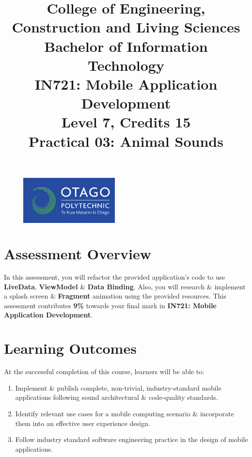 \documentclass{article}
\author{}
\begin{document}
\begin{figure}
    \centering
    \includegraphics[width=50mm]{./img/logo.png}
\end{figure}

\title{College of Engineering, Construction and Living Sciences\\Bachelor of Information Technology\\IN721: Mobile Application Development\\Level 7, Credits 15\\\textbf{Practical 03: Animal Sounds}}
\date{}
\maketitle

\section*{Assessment Overview}
In this assessment, you will refactor the provided application's code to use \textbf{LiveData}, \textbf{ViewModel} \& \textbf{Data Binding}. Also, you will research \& implement a splash screen \& \textbf{Fragment} animation using the provided resources. This assessment contributes \textbf{9\%} towards your final mark in \textbf{IN721: Mobile Application Development}.

\section*{Learning Outcomes}
At the successful completion of this course, learners will be able to: 
\begin{enumerate}
	\item Implement \& publish complete, non-trivial, industry-standard mobile applications following sound architectural \& code-quality standards.
	\item Identify relevant use cases for a mobile computing scenario \& incorporate them into an effective user experience design.
	\item Follow industry standard software engineering practice in the design of mobile applications.
\end{enumerate} 
\end{document}
